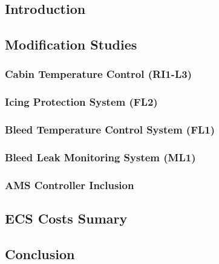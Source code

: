 \subsection{Introduction}
    

\subsection{Modification Studies}
    \subsubsection{Cabin Temperature Control (RI1-L3)}
        
    \subsubsection{Icing Protection System (FL2)}
        
    \subsubsection{Bleed Temperature Control System (FL1)}
        
    \subsubsection{Bleed Leak Monitoring System (ML1)}
        
    \subsubsection{AMS Controller Inclusion}
        

\subsection{ECS Costs Sumary}
    

\subsection{Conclusion}
    
